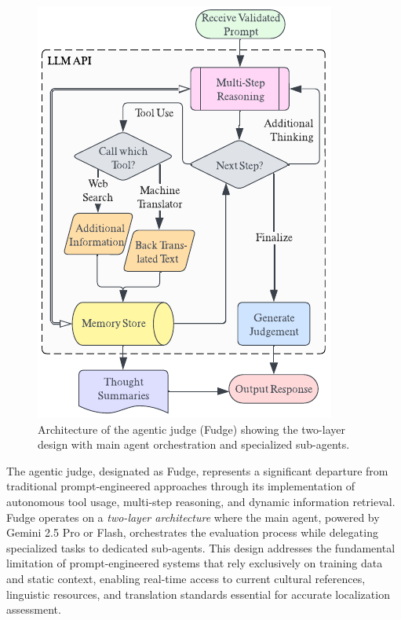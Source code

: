 \documentclass[conference]{IEEEtran}
\begin{document}
\begin{figure}[htbp]
\centering
\includegraphics[width=\columnwidth]{fudge-architecture.pdf}
\caption{Architecture of the agentic judge (Fudge) showing the two-layer design with main agent orchestration and specialized sub-agents.}
\label{fig:fudge_architecture}
\end{figure}

The agentic judge, designated as Fudge, represents a significant departure from traditional prompt-engineered approaches through its implementation of autonomous tool usage, multi-step reasoning, and dynamic information retrieval. Fudge operates on a \textit{two-layer architecture} where the main agent, powered by Gemini 2.5 Pro or Flash, orchestrates the evaluation process while delegating specialized tasks to dedicated sub-agents. This design addresses the fundamental limitation of prompt-engineered systems that rely exclusively on training data and static context, enabling real-time access to current cultural references, linguistic resources, and translation standards essential for accurate localization assessment.
\end{document}
